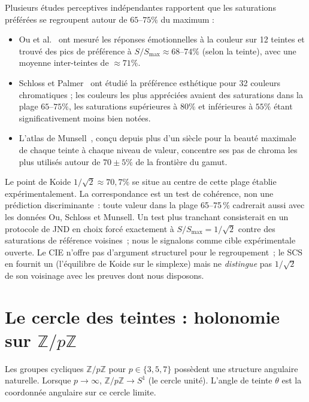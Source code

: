 \documentclass[12pt,a4paper]{article}
\begin{document}
\begin{remark}
Plusieurs \'etudes perceptives ind\'ependantes rapportent que les
saturations pr\'ef\'er\'ees se regroupent autour de $65$--$75\%$ du
maximum :
\begin{itemize}[nosep]
\item Ou et al.~\cite{ou2004} ont mesur\'e les r\'eponses \'emotionnelles
  \`a la couleur sur 12 teintes et trouv\'e des pics de
  \og pr\'ef\'erence \fg{} \`a $S/S_{\max} \approx 68$--$74\%$ (selon
  la teinte), avec une moyenne inter-teintes de $\approx 71\%$.
\item Schloss et Palmer~\cite{schloss2010} ont \'etudi\'e la
  pr\'ef\'erence esth\'etique pour 32 couleurs chromatiques ; les
  couleurs les plus appr\'eci\'ees avaient des saturations dans la
  plage $65$--$75\%$, les saturations sup\'erieures \`a $80\%$ et
  inf\'erieures \`a $55\%$ \'etant significativement moins bien not\'ees.
\item L'atlas de Munsell~\cite{munsell1905}, con\c{c}u depuis plus
  d'un si\`ecle pour la \og beaut\'e maximale \fg{} de chaque teinte \`a
  chaque niveau de valeur, concentre ses pas de chroma les plus utilis\'es
  autour de $70\pm5\%$ de la fronti\`ere du gamut.
\end{itemize}
Le point de Koide $1/\sqrt{2} \approx 70{,}7\%$ se situe au centre de
cette plage \'etablie exp\'erimentalement. La correspondance est un
test de coh\'erence, non une pr\'ediction discriminante~: toute valeur
dans la plage 65--75\,\% cadrerait aussi avec les donn\'ees Ou,
Schloss et Munsell. Un test plus tranchant consisterait en un
protocole de JND en choix forc\'e exactement \`a
$S/S_{\max} = 1/\sqrt{2}$ contre des saturations de r\'ef\'erence
voisines~; nous le signalons comme cible exp\'erimentale ouverte. Le
CIE n'offre pas d'argument structurel pour le regroupement~; le SCS
en fournit un (l'\'equilibre de Koide sur le simplexe) mais ne
\emph{distingue} pas $1/\sqrt{2}$ de son voisinage avec les
preuves dont nous disposons.
\end{remark}

\section{Le cercle des teintes : holonomie sur $\mathbb{Z}/p\mathbb{Z}$}
\label{sec:hue}

Les groupes cycliques $\mathbb{Z}/p\mathbb{Z}$ pour $p \in \{3,5,7\}$
poss\`edent une structure angulaire naturelle. Lorsque $p \to \infty$,
$\mathbb{Z}/p\mathbb{Z} \to S^1$ (le cercle unit\'e). L'angle de
teinte $\theta$ est la coordonn\'ee angulaire sur ce cercle limite.
\end{document}
